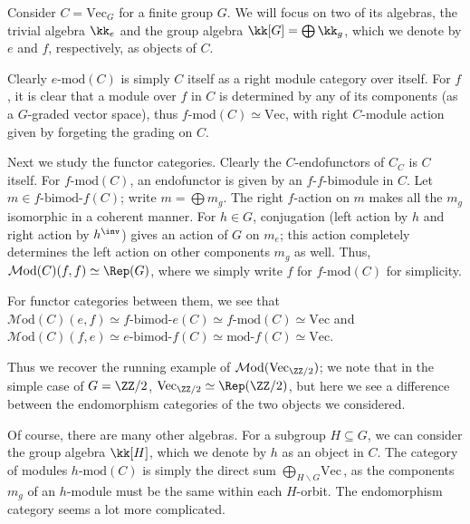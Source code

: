 \documentclass[12pt]{article}
\newcommand{\Mod}{{\mathcal{M}\textrm{od}}}
\newcommand{\Vect}{{\textrm{Vec}}}
\newcommand{\bimod}[2]{{#1\textrm{-bimod-}#2}}
\newcommand{\amod}[1]{{#1\textrm{-mod}}}
\newcommand{\moda}[1]{{\textrm{mod-}#1}}
\newcommand{\ModA}[1]{{\Mod(#1)}}
\begin{document}
\begin{example}
Consider $C = \Vect_{G}$ for a finite group $G$.
We will focus on two of its algebras,
the trivial algebra $\kk_e$
and the group algebra $\kk[G] = \bigoplus \kk_g$,
which we denote by $e$ and $f$, respectively,
as objects of $C$.

Clearly $\amod{e}(C)$ is simply $C$ itself
as a right module category over itself.
For $f$, it is clear that a module over $f$ in $C$
is determined by any of its components
(as a $G$-graded vector space),
thus $\amod{f}(C) \simeq \Vect$,
with right $C$-module action given by forgeting
the grading on $C$.

Next we study the functor categories.
Clearly the $C$-endofunctors of $C_C$ is $C$ itself.
For $\amod{f}(C)$,
an endofunctor is given by an $f$-$f$-bimodule in $C$.
Let $m \in \bimod{f}{f}(C)$;
write $m = \bigoplus m_g$.
The right $f$-action on $m$ makes all the $m_g$ isomorphic
in a coherent manner.
For $h \in G$, conjugation (left action by $h$ and right action
by $h^\inv$) gives an action of $G$ on $m_e$;
this action completely determines the left action
on other components $m_g$ as well.
Thus, $\ModA{C}(f,f) \simeq \Rep(G)$,
where we simply write $f$ for $\amod{f}(C)$ for simplicity.

For functor categories between them, we see that
$\ModA{C}(e,f) \simeq \bimod{f}{e}(C) \simeq \amod{f}(C)
\simeq \Vect$
and
$\ModA{C}(f,e) \simeq \bimod{e}{f}(C) \simeq \moda{f}(C)
\simeq \Vect$.

Thus we recover the running example of $\ModA{\Vect_{\ZZ/2}}$;
we note that in the simple case of $G = \ZZ/2$,
$\Vect_{\ZZ/2} \simeq \Rep(\ZZ/2)$,
but here we see a difference between the endomorphism
categories of the two objects we considered.


Of course, there are many other algebras.
For a subgroup $H \subseteq G$,
we can consider the group algebra $\kk[H]$,
which we denote by $h$ as an object in $C$.
The category of modules $\amod{h}(C)$
is simply the direct sum $\bigoplus_{H \backslash G} \Vect$,
as the components $m_g$ of an $h$-module
must be the same within each $H$-orbit.
The endomorphism category seems a lot more complicated.
\end{example}
\end{document}
